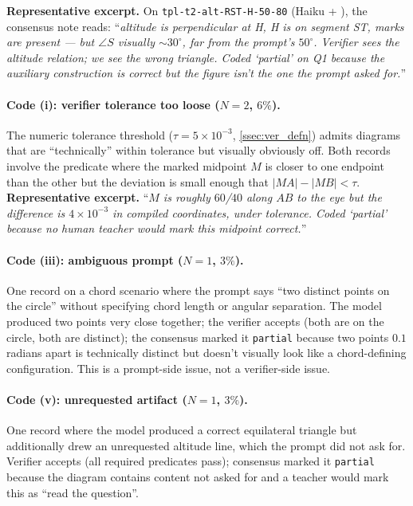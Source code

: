 \textbf{Representative excerpt.}
On \texttt{tpl-t2-alt-RST-H-50-80} (Haiku + \structured), the consensus note reads: ``\textit{altitude is perpendicular at H, H is on segment ST, marks are present --- but $\angle S$ visually $\sim 30^\circ$, far from the prompt's $50^\circ$. Verifier sees the altitude relation; we see the wrong triangle. Coded `partial' on Q1 because the auxiliary construction is correct but the figure isn't the one the prompt asked for.}''

\paragraph{Code (i): verifier tolerance too loose ($N{=}2$, $6\%$).}
The numeric tolerance threshold ($\tau = 5\times 10^{-3}$, \cref{ssec:ver_defn}) admits diagrams that are ``technically'' within tolerance but visually obviously off.
Both records involve the  predicate where the marked midpoint $M$ is closer to one endpoint than the other but the deviation is small enough that $|MA| - |MB| < \tau$.
\textbf{Representative excerpt.}
``\textit{$M$ is roughly $60$/$40$ along $AB$ to the eye but the difference is $4 \times 10^{-3}$ in compiled coordinates, under tolerance. Coded `partial' because no human teacher would mark this midpoint correct.}''

\paragraph{Code (iii): ambiguous prompt ($N{=}1$, $3\%$).}
One record on a chord scenario where the prompt says ``two distinct points on the circle'' without specifying chord length or angular separation.
The model produced two points very close together; the verifier accepts (both are on the circle, both are distinct); the consensus marked it \texttt{partial} because two points $0.1$ radians apart is technically distinct but doesn't visually look like a chord-defining configuration.
This is a prompt-side issue, not a verifier-side issue.

\paragraph{Code (v): unrequested artifact ($N{=}1$, $3\%$).}
One record where the model produced a correct equilateral triangle but additionally drew an unrequested altitude line, which the prompt did not ask for.
Verifier accepts (all required predicates pass); consensus marked it \texttt{partial} because the diagram contains content not asked for and a teacher would mark this as ``read the question''.

